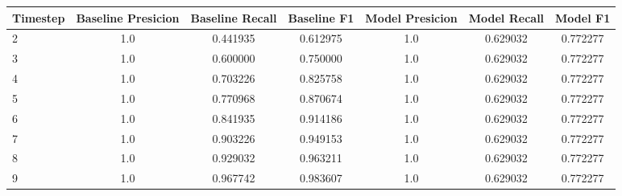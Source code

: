 \begin{tabular}{lcccccc}
\toprule
 Timestep &  Baseline Presicion &  Baseline Recall &  Baseline F1 &  Model Presicion &  Model Recall &  Model F1 \\
\midrule
        2 &                 1.0 &         0.441935 &     0.612975 &              1.0 &      0.629032 &  0.772277 \\
        3 &                 1.0 &         0.600000 &     0.750000 &              1.0 &      0.629032 &  0.772277 \\
        4 &                 1.0 &         0.703226 &     0.825758 &              1.0 &      0.629032 &  0.772277 \\
        5 &                 1.0 &         0.770968 &     0.870674 &              1.0 &      0.629032 &  0.772277 \\
        6 &                 1.0 &         0.841935 &     0.914186 &              1.0 &      0.629032 &  0.772277 \\
        7 &                 1.0 &         0.903226 &     0.949153 &              1.0 &      0.629032 &  0.772277 \\
        8 &                 1.0 &         0.929032 &     0.963211 &              1.0 &      0.629032 &  0.772277 \\
        9 &                 1.0 &         0.967742 &     0.983607 &              1.0 &      0.629032 &  0.772277 \\
\bottomrule
\end{tabular}
